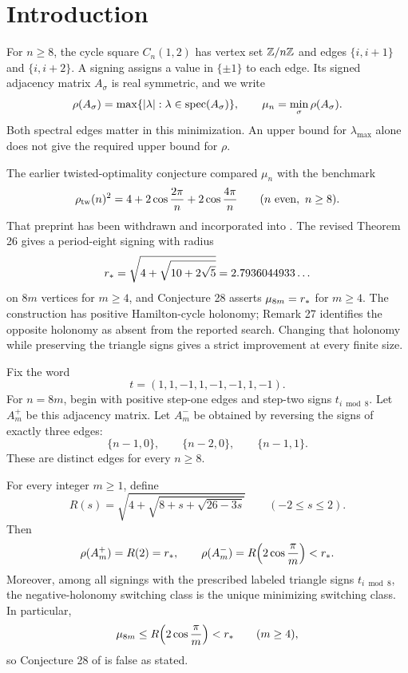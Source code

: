\section{Introduction}

For $n\ge8$, the cycle square $C_n(1,2)$ has vertex set $\mathbb Z/n\mathbb Z$ and
edges $\{i,i+1\}$ and $\{i,i+2\}$. A signing assigns a value in
$\{\pm1\}$ to each edge. Its signed adjacency matrix $A_\sigma$ is real
symmetric, and we write
\[
 \rho(A_\sigma)=\max\{|\lambda|:\lambda\in\operatorname{spec}(A_\sigma)\},
 \qquad \mu_n=\min_\sigma\rho(A_\sigma).
\]
Both spectral edges matter in this minimization. An upper bound for
$\lambda_{\max}$ alone does not give the required upper bound for $\rho$.

The earlier twisted-optimality conjecture \cite{Suvagiya2026old} compared
$\mu_n$ with the benchmark
\begin{equation}
 \rho_{\mathrm{tw}}(n)^2=4+2\cos\frac{2\pi}{n}+2\cos\frac{4\pi}{n}
 \qquad(n\text{ even},\ n\ge8).
 \label{eq:twisted}
\end{equation}
That preprint has been withdrawn and incorporated into
\cite{Suvagiya2026}. The revised Theorem 26 gives a period-eight signing
with radius
\begin{equation}
 r_*=\sqrt{4+\sqrt{10+2\sqrt5}}
       =2.7936044933\ldots
 \label{eq:rstar}
\end{equation}
on $8m$ vertices for $m\ge4$, and Conjecture 28 asserts $\mu_{8m}=r_*$
for $m\ge4$. The construction has positive Hamilton-cycle holonomy;
Remark 27 identifies the opposite holonomy as absent from the reported
search. Changing that holonomy while preserving the triangle signs gives
a strict improvement at every finite size.

Fix the word
\begin{equation}
 t=(1,1,-1,1,-1,-1,1,-1).
 \label{eq:word}
\end{equation}
For $n=8m$, begin with positive step-one edges and step-two signs
$t_{i\bmod8}$. Let $A_m^+$ be this adjacency matrix. Let $A_m^-$ be obtained
by reversing the signs of exactly three edges:
\begin{equation}
 \{n-1,0\},\qquad \{n-2,0\},\qquad \{n-1,1\}.
 \label{eq:seam}
\end{equation}
These are distinct edges for every $n\ge8$.

\begin{theorem}\label{thm:main}
For every integer $m\ge1$, define
\[
 R(s)=\sqrt{4+\sqrt{8+s+\sqrt{26-3s}}}\qquad(-2\le s\le2).
\]
Then
\begin{equation}
 \rho(A_m^+)=R(2)=r_*,
 \qquad
 \rho(A_m^-)=R\!\left(2\cos\frac{\pi}{m}\right)<r_*.
 \label{eq:main}
\end{equation}
Moreover, among all signings with the prescribed labeled triangle signs
$t_{i\bmod8}$, the negative-holonomy switching class is the unique
minimizing switching class. In particular,
\[
 \mu_{8m}\le R\!\left(2\cos\frac{\pi}{m}\right)<r_*
 \qquad(m\ge4),
\]
so Conjecture 28 of \cite{Suvagiya2026} is false as stated.
\end{theorem}

